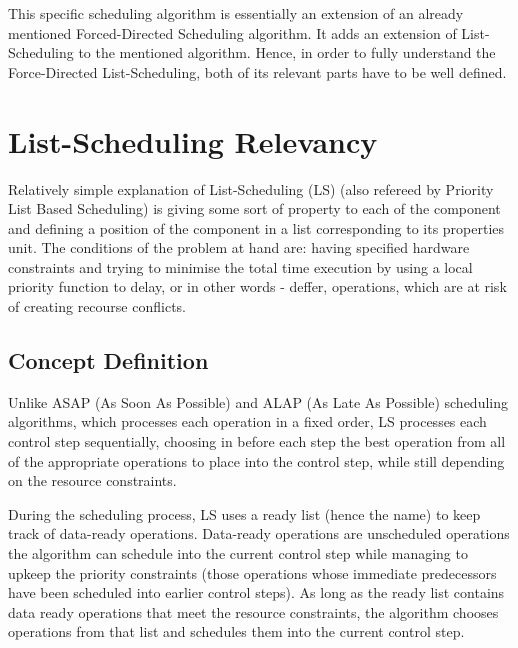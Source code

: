 \documentclass[conference]{IEEEtran}
\begin{document}
This specific scheduling algorithm is essentially an extension of an already mentioned Forced-Directed Scheduling algorithm. It adds an extension of List-Scheduling to the mentioned algorithm. Hence, in order to fully understand the Force-Directed List-Scheduling, both of its relevant parts have to be well defined.

\section{List-Scheduling Relevancy}

Relatively simple explanation of List-Scheduling (LS) (also refereed by Priority List Based Scheduling) is giving some sort of property to each of the component and defining a position of the component in a list corresponding to its properties unit. The conditions of the problem at hand are: having specified hardware constraints and trying to minimise the total time execution by using a local priority function to delay, or in other words - deffer, operations, which are at risk of creating recourse conflicts.

\subsection{Concept Definition}

Unlike ASAP (As Soon As Possible) and ALAP (As Late As Possible) scheduling algorithms, which processes each operation in a fixed order, LS processes each control step sequentially, choosing in before each step the best operation from all of the appropriate operations to place into the control step, while still depending on the resource constraints.

During the scheduling process, LS uses a ready list (hence the name) to keep track of data-ready operations. Data-ready operations are unscheduled operations the algorithm can schedule into the current control step while managing to upkeep the priority constraints (those operations whose immediate predecessors have been scheduled into earlier control steps). As long as the ready list contains data ready operations that meet the resource constraints, the algorithm chooses operations from that list and schedules them into the current control step. 
\end{document}
